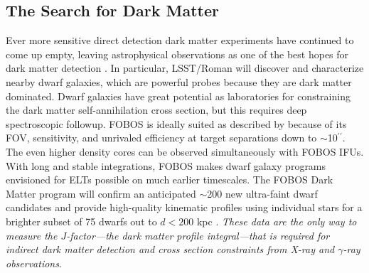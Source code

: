 \documentclass[oneside,11pt]{amsart}
\newcommand{\arcsec}{\mbox{$^{\prime\prime}$}}
\newcommand{\note}[2][todo]{{\color{#1}[[{\bf #2}]]}}
\begin{document}
%    







\subsection{The Search for Dark Matter} 
\label{sec:darkmatter}

Ever more sensitive direct detection dark matter experiments have continued to come up empty, leaving astrophysical observations as one of the best hopes for dark matter detection \citep{drlica-wagner19}.  In particular, LSST/Roman will discover and characterize nearby dwarf galaxies, which are powerful probes because they are dark matter dominated.  Dwarf galaxies have great potential as laboratories for constraining the dark matter self-annihilation cross section, but this requires deep spectroscopic followup.  FOBOS is ideally suited as described by \citet{simon19} because of its FOV, sensitivity, and unrivaled efficiency at target separations down to $\sim$10\arcsec.  The even higher density cores can be observed simultaneously with FOBOS IFUs.  With long and stable integrations, FOBOS makes dwarf galaxy programs envisioned for ELTs possible on much earlier timescales.  The FOBOS Dark Matter program will confirm an anticipated $\sim$200 new ultra-faint dwarf candidates and provide high-quality kinematic profiles using individual stars for a brighter subset of 75 dwarfs out to $d < 200$ kpc \citep{drlica-wagner19}.  \emph{These data are the only way to measure the $J$-factor---the dark matter profile integral---that is required for indirect dark matter detection and cross section constraints from X-ray and $\gamma$-ray observations}.  
\end{document}
